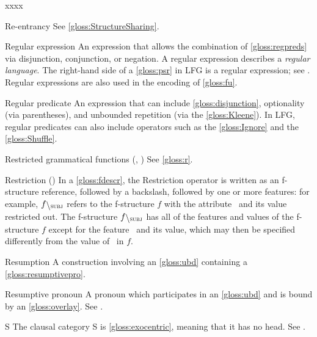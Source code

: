 \documentclass[output=paper,colorlinks,citecolor=brown]{langscibook}
\begin{document}
\begin{labeling}{xxxx}
\item[Re-entrancy] See \ref{gloss:StructureSharing}.

\item[Regular expression\namedlabel{gloss:regex}{regular expression}] An expression that allows the combination of \ref{gloss:regpreds} via disjunction, conjunction, or negation.  A regular expression describes a \emph{regular language}.  The right-hand side of a \ref{gloss:psr} in LFG is a regular expression; see \citetv[\ref{sect:intro:c-structure}]{chapters/Intro}.  Regular expressions are also used in the encoding of \ref{gloss:fu}.

\item[Regular predicate\namedlabel{gloss:regpreds}{regular predicates}] An expression that can include \ref{gloss:disjunction}, optionality (via parentheses), and unbounded repetition (via the \ref{gloss:Kleene}).  In LFG, regular predicates can also include operators such as the \ref{gloss:Ignore} and the \ref{gloss:Shuffle}.

\item[Restricted grammatical functions (\OBJTHETA, \OBLTHETA)] See \ref{gloss:r}.

\item[Restriction (\restrict{})\namedlabel{gloss:Restrict}{Restriction}] In a \ref{gloss:fdescr}, the Restriction operator is written as an f-structure reference, followed by a backslash, followed by one or more features: for example, $f\restrict{\SUBJ}$ refers to the f-structure $f$ with the attribute \SUBJ\ and its value restricted out.  The f-structure $f\restrict{\SUBJ}$ has all of the features and values of the f-structure $f$ except for the feature \SUBJ\ and its value, which may then be specified differently from the value of \SUBJ\ in $f$.

\item[Resumption\namedlabel{gloss:Resumption}{Resumption}] A construction involving an \ref{gloss:ubd} containing a \ref{gloss:resumptivepro}.

\item[Resumptive pronoun\namedlabel{gloss:resumptivepro}{resumptive pronoun}] A pronoun which participates in an \ref{gloss:ubd} and is bound by an \ref{gloss:overlay}.  See .

\item[S\namedlabel{gloss:S}{S}] The clausal category S is \ref{gloss:exocentric}, meaning that it has no head.  See \citetv[\ref{sec:CoreConcepts:S}]{chapters/CoreConcepts}.


\end{labeling}
\end{document}
